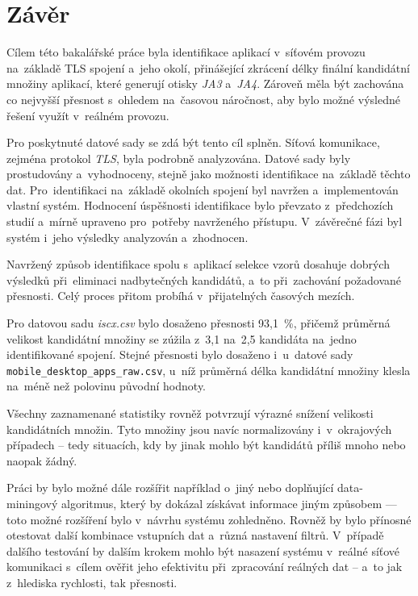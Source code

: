 \chapter{Závěr}
Cílem této bakalářské práce byla identifikace aplikací v~síťovém provozu na~základě TLS spojení a~jeho okolí, přinášející zkrácení délky finální kandidátní množiny aplikací, které generují otisky \textit{JA3} a~\textit{JA4}. Zároveň měla být zachována co nejvyšší přesnost s~ohledem na~časovou náročnost, aby bylo možné výsledné řešení využít v~reálném provozu.

Pro poskytnuté datové sady se zdá být tento cíl splněn. Síťová komunikace, zejména protokol \textit{TLS}, byla podrobně analyzována. Datové sady byly prostudovány a~vyhodnoceny, stejně jako možnosti identifikace na~základě těchto dat. Pro~identifikaci na~základě okolních spojení byl navržen a~implementován vlastní systém. Hodnocení úspěšnosti identifikace bylo převzato z~předchozích studií a~mírně upraveno pro~potřeby navrženého přístupu. V~závěrečné fázi byl systém i~jeho výsledky analyzován a~zhodnocen.

Navržený způsob identifikace spolu s~aplikací selekce vzorů dosahuje dobrých výsledků při~eliminaci nadbytečných kandidátů, a~to při~zachování požadované přesnosti. Celý proces přitom probíhá v~přijatelných časových mezích.

Pro datovou sadu \textit{iscx.csv} bylo dosaženo přesnosti 93{,}1~\%, přičemž průměrná velikost kandidátní množiny se zúžila z~3{,}1 na~2{,}5 kandidáta na~jedno identifikované spojení. Stejné přesnosti bylo dosaženo i~u~datové sady \texttt{mobile\_desktop\_apps\_raw.csv}, u~níž průměrná délka kandidátní množiny klesla na~méně než polovinu původní hodnoty.

Všechny zaznamenané statistiky rovněž potvrzují výrazné snížení velikosti kandidátních množin. Tyto množiny jsou navíc normalizovány i~v~okrajových případech -- tedy situacích, kdy by jinak mohlo být kandidátů příliš mnoho nebo naopak žádný.

Práci by bylo možné dále rozšířit například o~jiný nebo doplňující data-miningový algoritmus, který by dokázal získávat informace jiným způsobem — toto možné rozšíření bylo v~návrhu systému zohledněno. Rovněž by bylo přínosné otestovat další kombinace vstupních dat a~různá nastavení filtrů. V~případě dalšího testování by dalším krokem mohlo být nasazení systému v~reálné síťové komunikaci s~cílem ověřit jeho efektivitu při~zpracování reálných dat -- a~to jak z~hlediska rychlosti, tak přesnosti.